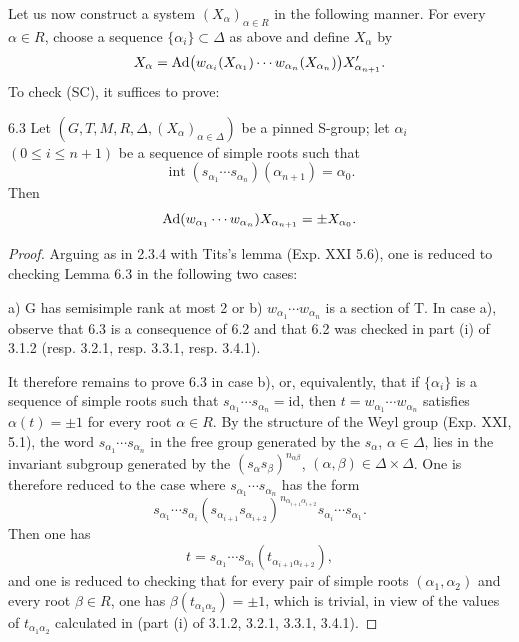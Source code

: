 Let us now construct a system $(X_\alpha)_{\alpha\in R}$ in the following manner. For every $\alpha\in R$, choose a sequence $\{\alpha_i\}\subset\Delta$ as above and define $X_\alpha$ by
\[
X_\alpha=\operatorname{Ad}\bigl(w_{\alpha_i}(X_{\alpha_1})\cdots w_{\alpha_n}(X_{\alpha_n})\bigr)X'_{\alpha_{n+1}}.
\]
To check (SC), it suffices to prove:
\begin{lemma}{6.3}\label{XXIII.6.3}
Let $(G,T,M,R,\Delta,(X_\alpha)_{\alpha\in\Delta})$ be a pinned S-group; let $\alpha_i$ $(0\leq i\leq n+1)$ be a sequence of simple roots such that
\[
\operatorname{int}(s_{\alpha_1}\cdots s_{\alpha_n})(\alpha_{n+1})=\alpha_0.
\]
Then
\[
\operatorname{Ad}(w_{\alpha_1}\cdots w_{\alpha_n})X_{\alpha_{n+1}}=\pm X_{\alpha_0}.
\]
\end{lemma}
\begin{proof}
Arguing as in 2.3.4 with Tits's lemma (Exp. XXI 5.6), one is reduced to checking Lemma 6.3 in the following two cases:

 a) G has semisimple rank at most 2 or b) $w_{\alpha_1}\cdots w_{\alpha_n}$ is a section of T. In case a), observe that 6.3 is a consequence of 6.2 and that 6.2 was checked in part (i) of 3.1.2 (resp. 3.2.1, resp. 3.3.1, resp. 3.4.1).

It therefore remains to prove 6.3 in case b), or, equivalently, that if $\{\alpha_i\}$ is a sequence of simple roots such that $s_{\alpha_1}\cdots s_{\alpha_n}=\mathrm{id}$, then $t=w_{\alpha_1}\cdots w_{\alpha_n}$ satisfies $\alpha(t)=\pm1$ for every root $\alpha\in R$. By the structure of the Weyl group (Exp. XXI, 5.1), the word $s_{\alpha_1}\cdots s_{\alpha_n}$ in the free group generated by the $s_\alpha$, $\alpha\in\Delta$, lies in the invariant subgroup generated by the $(s_\alpha s_\beta)^{n_{\alpha\beta}}$, $(\alpha,\beta)\in\Delta\times\Delta$. One is therefore reduced to the case where $s_{\alpha_1}\cdots s_{\alpha_n}$ has the form
\[
s_{\alpha_1}\cdots s_{\alpha_i}(s_{\alpha_{i+1}}s_{\alpha_{i+2}})^{n_{\alpha_{i+1}\alpha_{i+2}}}s_{\alpha_i}\cdots s_{\alpha_1}.
\]
Then one has
\[
t=s_{\alpha_1}\cdots s_{\alpha_i}(t_{\alpha_{i+1}\alpha_{i+2}}),
\]
and one is reduced to checking that for every pair of simple roots $(\alpha_1,\alpha_2)$ and every root $\beta\in R$, one has $\beta(t_{\alpha_1\alpha_2})=\pm1$, which is trivial, in view of the values of $t_{\alpha_1\alpha_2}$ calculated in  (part (i) of 3.1.2, 3.2.1, 3.3.1, 3.4.1).
\end{proof}
